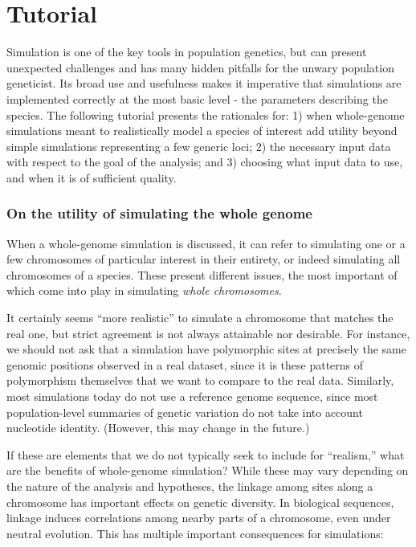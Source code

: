 \documentclass[hidelinks]{article}
\begin{document}
\hypertarget{tutorial}{%
\section{Tutorial}\label{tutorial}}

Simulation is one of the key tools in population genetics, but can
present unexpected challenges and has many hidden pitfalls for the
unwary population geneticist. Its broad use and usefulness makes it
imperative that simulations are implemented correctly at the most basic
level - the parameters describing the species. The following tutorial
presents the rationales for: 1) when whole-genome simulations meant to
realistically model a species of interest add utility beyond simple
simulations representing a few generic loci; 2) the necessary input data
with respect to the goal of the analysis; and 3) choosing what input
data to use, and when it is of sufficient quality.

\hypertarget{on-the-utility-of-simulating-the-whole-genome}{%
\subsubsection{On the utility of simulating the whole
genome}\label{on-the-utility-of-simulating-the-whole-genome}}

When a whole-genome simulation is discussed, it can refer to simulating
one or a few chromosomes of particular interest in their entirety, or
indeed simulating all chromosomes of a species. These present different
issues, the most important of which come into play in simulating
\emph{whole chromosomes}.

It certainly seems ``more realistic'' to simulate a chromosome that
matches the real one, but strict agreement is not always attainable nor
desirable. For instance, we should not ask that a simulation have
polymorphic sites at precisely the same genomic positions observed in a
real dataset, since it is these patterns of polymorphism themselves that
we want to compare to the real data. Similarly, most simulations today
do not use a reference genome sequence, since most population-level
summaries of genetic variation do not take into account nucleotide
identity. (However, this may change in the future.)

If these are elements that we do not typically seek to include for
``realism,'' what are the benefits of whole-genome simulation? While
these may vary depending on the nature of the analysis and hypotheses,
the linkage among sites along a chromosome has important effects on
genetic diversity. In biological sequences, linkage induces correlations
among nearby parts of a chromosome, even under neutral evolution. This
has multiple important consequences for simulations:
\end{document}
